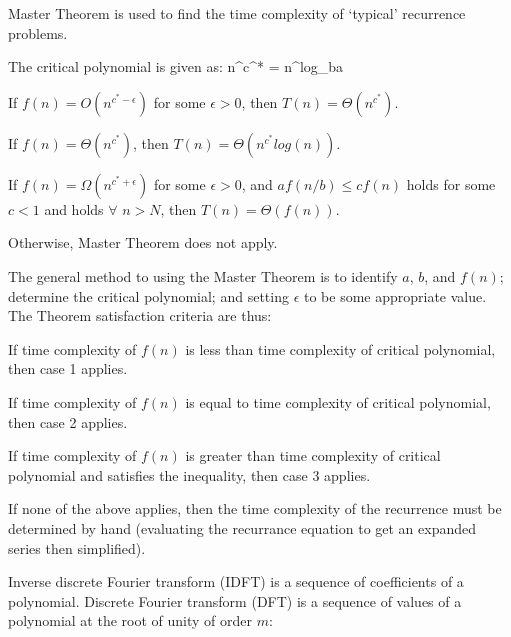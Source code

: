 
        Master Theorem is used to find the time complexity of `typical' recurrence problems.

        The critical polynomial is given as:
        \startformula n^{c^{*}} = n^{log_{b}a} \stopformula

        \startitemize[n]
            \item If $f(n) = O(n^{c^{*} - \epsilon})$ for some $\epsilon > 0$, then $T(n) = \Theta(n^{c^{*}})$.
            \item If $f(n) = \Theta(n^{c^{*}})$, then $T(n) = \Theta(n^{c^{*}}log(n))$.
            \item If $f(n) = \Omega(n^{c^{*} + \epsilon})$ for some $\epsilon > 0$, and $af(n/b) \leq cf(n)$ holds for some $c < 1$ and holds $\forall$ $n > N$, then $T(n) = \Theta(f(n))$.
            \item Otherwise, Master Theorem does not apply.
        \stopitemize

        The general method to using the Master Theorem is to identify $a$, $b$, and $f(n)$; determine the critical polynomial; and setting $\epsilon$ to be some appropriate value. The Theorem satisfaction criteria are thus:
        \startitemize
            \item If time complexity of $f(n)$ is less than time complexity of critical polynomial, then case 1 applies.
            \item If time complexity of $f(n)$ is equal to time complexity of critical polynomial, then case 2 applies.
            \item If time complexity of $f(n)$ is greater than time complexity of critical polynomial and satisfies the inequality, then case 3 applies.
            \item If none of the above applies, then the time complexity of the recurrence must be determined by hand (evaluating the recurrance equation to get an expanded series then simplified).
        \stopitemize

\subject{Fast Fourier Transform} %

    Inverse discrete Fourier transform (IDFT) is a sequence of coefficients of a polynomial. Discrete Fourier transform (DFT) is a sequence of values of a polynomial at the root of unity of order $m$:
    \startformula{}\stopformula

